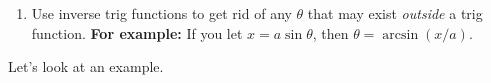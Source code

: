 \documentclass[12pt]{article}
\theoremstyle{definition}
\newcommand{\opp}{\text{opposite}}
\newcommand{\adj}{\text{adjacent}}
\newcommand{\hyp}{\text{hypotenuse}}
\begin{document}
{\begin{enumerate}[label=P\arabic*.]
\begin{itemize}
\begin{enumerate}
\begin{center}
							\end{center}
							\vspace{2mm}
							\textbf{Don't forget the Pythagorean Theorem:} $\adj^2+\opp^2=\hyp^2.$

							\item Use inverse trig functions to get rid of any $\theta$ that may exist \textit{outside} a trig function. \textbf{For example:} If you let $x=a\sin\theta$, then $\theta=\arcsin(x/a)$.
						\end{enumerate}
				\end{itemize}
		\end{enumerate}
	
	Let's look at an example.}
\end{document}
